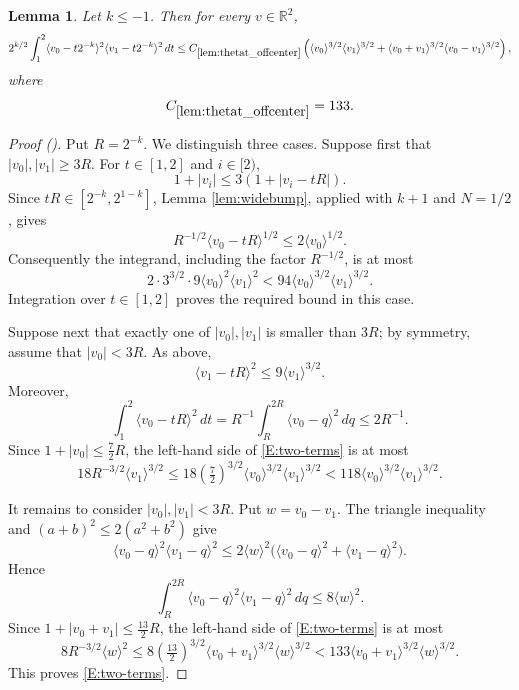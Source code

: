 \documentclass[12pt,reqno]{amsart}
\newcommand{\auto}{{({\tiny\faCar})}}
\theoremstyle{plain}
\newtheorem{lemma}[theorem]{Lemma}
\numberwithin{equation}{section}
\theoremstyle{remark}
\newcommand{\uses}[1]{}
\newcommand{\usesdefs}[1]{}
\newcommand{\R}{{\mathbb R}}
\begin{document}
\begin{lemma}\label{lem:thetat_offcenter}\uses{lem:widebump}\usesdefs{bracket bump}
Let $k\le-1$. Then for every $v\in\R^2$,
\begin{equation}\label{E:two-terms}
2^{k/2}\int_1^2
\langle v_0-t2^{-k}\rangle^2
\langle v_1-t2^{-k}\rangle^2\,dt
\le C_{\ref{lem:thetat_offcenter}}
\left(
\langle v_0\rangle^{3/2}\langle v_1\rangle^{3/2}
+
\langle v_0+v_1\rangle^{3/2}\langle v_0-v_1\rangle^{3/2}
\right),
\end{equation}
where
\begin{equation}\label{off center bump constant}
C_{\ref{lem:thetat_offcenter}}=133.
\end{equation}
\end{lemma}
\begin{proof}[Proof \auto]
Put $R=2^{-k}$. We distinguish three cases.
Suppose first that $|v_0|,|v_1|\ge3R$. For $t\in[1,2]$ and $i\in[2)$,
\[
1+|v_i|\le3(1+|v_i-tR|).
\]
Since $tR\in[2^{-k},2^{1-k}]$, Lemma \ref{lem:widebump}, applied with $k+1$ and $N=1/2$, gives
\[
R^{-1/2}\langle v_0-tR\rangle^{1/2}
\le2\langle v_0\rangle^{1/2}.
\]
Consequently the integrand, including the factor $R^{-1/2}$, is at most
\[
2\cdot3^{3/2}\cdot9
\langle v_0\rangle^2\langle v_1\rangle^2
<94\langle v_0\rangle^{3/2}\langle v_1\rangle^{3/2}.
\]
Integration over $t\in[1,2]$ proves the required bound in this case.

Suppose next that exactly one of $|v_0|,|v_1|$ is smaller than $3R$; by symmetry, assume that $|v_0|<3R$. As above,
\[
\langle v_1-tR\rangle^2\le9\langle v_1\rangle^{3/2}.
\]
Moreover,
\[
\int_1^2\langle v_0-tR\rangle^2\,dt
=R^{-1}\int_R^{2R}\langle v_0-q\rangle^2\,dq
\le2R^{-1}.
\]
Since $1+|v_0|\le\frac72R$, the left-hand side of \eqref{E:two-terms} is at most
\[
18R^{-3/2}\langle v_1\rangle^{3/2}
\le18\left(\tfrac72\right)^{3/2}
\langle v_0\rangle^{3/2}\langle v_1\rangle^{3/2}
<118\langle v_0\rangle^{3/2}\langle v_1\rangle^{3/2}.
\]

It remains to consider $|v_0|,|v_1|<3R$. Put $w=v_0-v_1$. The triangle inequality and $(a+b)^2\le2(a^2+b^2)$ give
\[
\langle v_0-q\rangle^2\langle v_1-q\rangle^2
\le2\langle w\rangle^2
\bigl(\langle v_0-q\rangle^2+\langle v_1-q\rangle^2\bigr).
\]
Hence
\[
\int_R^{2R}\langle v_0-q\rangle^2\langle v_1-q\rangle^2\,dq
\le8\langle w\rangle^2.
\]
Since $1+|v_0+v_1|\le\frac{13}{2}R$, the left-hand side of \eqref{E:two-terms} is at most
\[
8R^{-3/2}\langle w\rangle^2
\le8\left(\tfrac{13}{2}\right)^{3/2}
\langle v_0+v_1\rangle^{3/2}\langle w\rangle^{3/2}
<133\langle v_0+v_1\rangle^{3/2}\langle w\rangle^{3/2}.
\]
This proves \eqref{E:two-terms}.
\end{proof}
\end{document}
